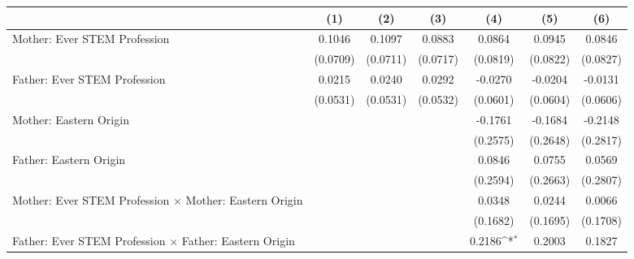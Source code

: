 {
\def\sym#1{\ifmmode^{#1}\else\(^{#1}\)\fi}
\begin{tabular}{l*{6}{c}}
\toprule
                    &\multicolumn{1}{c}{(1)}         &\multicolumn{1}{c}{(2)}         &\multicolumn{1}{c}{(3)}         &\multicolumn{1}{c}{(4)}         &\multicolumn{1}{c}{(5)}         &\multicolumn{1}{c}{(6)}         \\
\midrule
Mother: Ever STEM Profession&      0.1046         &      0.1097         &      0.0883         &      0.0864         &      0.0945         &      0.0846         \\
                    &    (0.0709)         &    (0.0711)         &    (0.0717)         &    (0.0819)         &    (0.0822)         &    (0.0827)         \\
\addlinespace
Father: Ever STEM Profession&      0.0215         &      0.0240         &      0.0292         &     -0.0270         &     -0.0204         &     -0.0131         \\
                    &    (0.0531)         &    (0.0531)         &    (0.0532)         &    (0.0601)         &    (0.0604)         &    (0.0606)         \\
\addlinespace
Mother: Eastern Origin&                     &                     &                     &     -0.1761         &     -0.1684         &     -0.2148         \\
                    &                     &                     &                     &    (0.2575)         &    (0.2648)         &    (0.2817)         \\
\addlinespace
Father: Eastern Origin&                     &                     &                     &      0.0846         &      0.0755         &      0.0569         \\
                    &                     &                     &                     &    (0.2594)         &    (0.2663)         &    (0.2807)         \\
\addlinespace
Mother: Ever STEM Profession $\times$ Mother: Eastern Origin&                     &                     &                     &      0.0348         &      0.0244         &      0.0066         \\
                    &                     &                     &                     &    (0.1682)         &    (0.1695)         &    (0.1708)         \\
\addlinespace
Father: Ever STEM Profession $\times$ Father: Eastern Origin&                     &                     &                     &      0.2186\sym{*}  &      0.2003         &      0.1827         \\

\end{tabular}}
